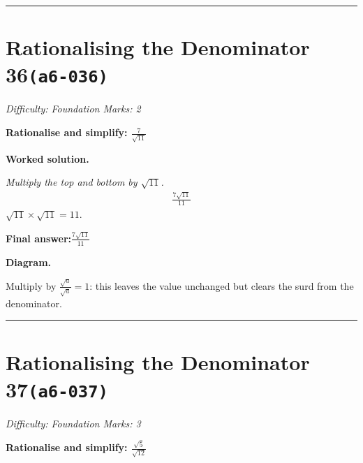 \documentclass[11pt]{article}
\newcommand{\question}[1]{\par\medskip\noindent\textbf{#1}\par}
\begin{document}
\medskip\hrule

\section*{Rationalising the Denominator 36\quad\small\texttt{(a6-036)}}
\textit{Difficulty: Foundation \quad\textbar\quad Marks: 2}

\question{Rationalise and simplify: \( \frac{7}{\sqrt{11}} \)}

\textbf{Worked solution.}

\textit{Multiply the top and bottom by \( \sqrt{11} \).}
\[\begin{gathered}
\frac{7\sqrt{11}}{11}
\end{gathered}\]
\( \sqrt{11} \times \sqrt{11} = 11 \).

\begin{answerbox}
\textbf{Final answer:}\quad \(\displaystyle \frac{7\sqrt{11}}{11}\)
\end{answerbox}
\textbf{Diagram.}

\begin{center}
\end{center}
\small Multiply by $\frac{\sqrt{a}}{\sqrt{a}}=1$: this leaves the value unchanged but clears the surd from the denominator.\normalsize

\medskip\hrule

\section*{Rationalising the Denominator 37\quad\small\texttt{(a6-037)}}
\textit{Difficulty: Foundation \quad\textbar\quad Marks: 3}

\question{Rationalise and simplify: \( \frac{\sqrt{5}}{\sqrt{12}} \)}
\end{document}
